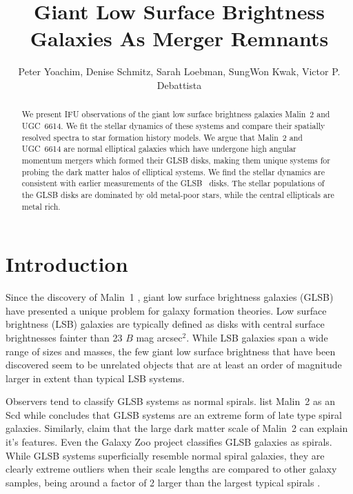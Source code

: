 \documentclass{emulateapj}
\newcommand\HI{\ion{H}{1}}
\begin{document}
\title{Giant Low Surface Brightness Galaxies As Merger Remnants}


\author{Peter Yoachim, Denise Schmitz, Sarah Loebman, SungWon Kwak, Victor P. Debattista
  }



\begin{abstract}
We present IFU observations of the giant low surface brightness galaxies Malin~2 and UGC~6614.  We fit the stellar dynamics of these systems and compare their spatially resolved spectra to star formation history models.  We argue that Malin~2 and UGC~6614 are normal elliptical galaxies which have undergone high angular momentum mergers which formed their GLSB disks, making them unique systems for probing the dark matter halos of elliptical systems.  We find the stellar dynamics are consistent with earlier measurements of the GLSB \HI\ disks.  The stellar populations of the GLSB disks are dominated by old metal-poor stars, while the central ellipticals are metal rich.

\end{abstract}


\section{Introduction}

Since the discovery of Malin~1 \citep{Bothun87}, giant low surface brightness galaxies (GLSB) have presented a unique problem for galaxy formation theories.  Low surface brightness (LSB) galaxies are typically defined as disks with central surface brightnesses fainter than 23 $B$ mag arcsec$^2$.  While LSB galaxies span a wide range of sizes and masses, the few giant low surface brightness that have been discovered seem to be unrelated objects that are at least an order of magnitude larger in extent than typical LSB systems. 

Observers tend to classify GLSB systems as normal spirals.  \citet{Matthews01b} list Malin~2 as an Scd while \citet{Das13} concludes that GLSB systems are an extreme form of late type spiral galaxies.  Similarly, \citet{Kasparova14} claim that the large dark matter scale of Malin~2 can explain it's features.  Even the Galaxy Zoo project \citep{Willett13}  classifies GLSB galaxies as spirals.  While GLSB systems superficially resemble normal spiral galaxies, they are clearly extreme outliers when their scale lengths are compared to other galaxy samples, being around a factor of 2 larger than the largest typical spirals \citep{Dalcanton97}. 
\end{document}
